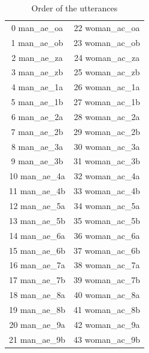 \documentclass[12pt,a4paper,oneside]{article}
\begin{document}
\begin{table}
\caption{Order of the utterances}
\label{tab:utt}
\centering
\footnotesize
    \begin{tabular}{cc}
    0 man\_ae\_oa & 22 woman\_ac\_oa\\
    1 man\_ae\_ob & 23 woman\_ac\_ob\\
    2 man\_ae\_za & 24 woman\_ac\_za\\
    3 man\_ae\_zb & 25 woman\_ac\_zb\\
    4 man\_ae\_1a & 26 woman\_ac\_1a\\
    5 man\_ae\_1b & 27 woman\_ac\_1b\\
    6 man\_ae\_2a & 28 woman\_ac\_2a\\
    7 man\_ae\_2b & 29 woman\_ac\_2b\\
    8 man\_ae\_3a & 30 woman\_ac\_3a\\
    9 man\_ae\_3b & 31 woman\_ac\_3b\\
    10 man\_ae\_4a & 32 woman\_ac\_4a\\
    11 man\_ae\_4b & 33 woman\_ac\_4b\\
    12 man\_ae\_5a & 34 woman\_ac\_5a\\
    13 man\_ae\_5b & 35 woman\_ac\_5b\\
    14 man\_ae\_6a & 36 woman\_ac\_6a\\
    15 man\_ae\_6b & 37 woman\_ac\_6b\\
    16 man\_ae\_7a & 38 woman\_ac\_7a\\
    17 man\_ae\_7b & 39 woman\_ac\_7b\\
    18 man\_ae\_8a & 40 woman\_ac\_8a\\
    19 man\_ae\_8b & 41 woman\_ac\_8b\\
    20 man\_ae\_9a & 42 woman\_ac\_9a\\
    21 man\_ae\_9b & 43 woman\_ac\_9b \\
    \end{tabular}
\end{table}
\end{document}
